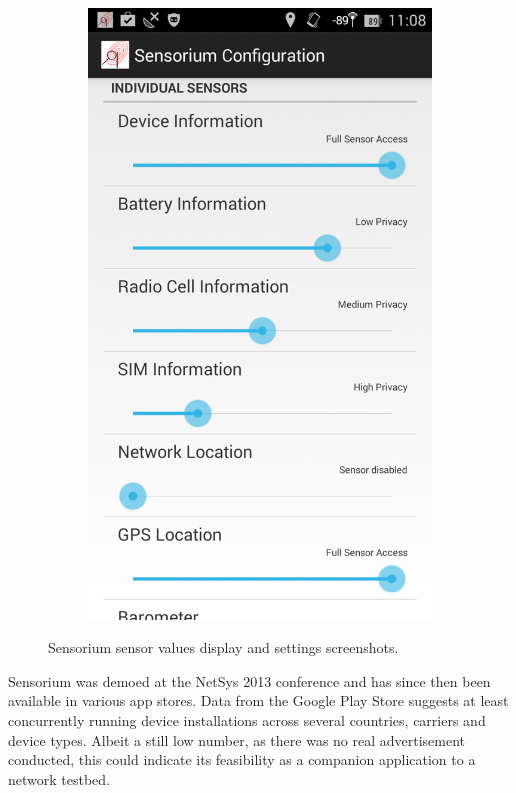 \begin{figure}[htb]
\begin{subfigure}[b]{0.45\textwidth}
		\includegraphics[width=\textwidth]{images/sensorium-settings.png}
	\end{subfigure}%
	\caption{Sensorium sensor values display and settings screenshots.}
\label{c5:fig:sensorium}
\end{figure}

Sensorium was demoed at the NetSys 2013 conference and has since then been available in various app stores. Data from the Google Play Store suggests at least  concurrently running device installations across several countries, carriers and device types. Albeit a still low number, as there was no real advertisement conducted, this could indicate its feasibility as a companion application to a network testbed.

